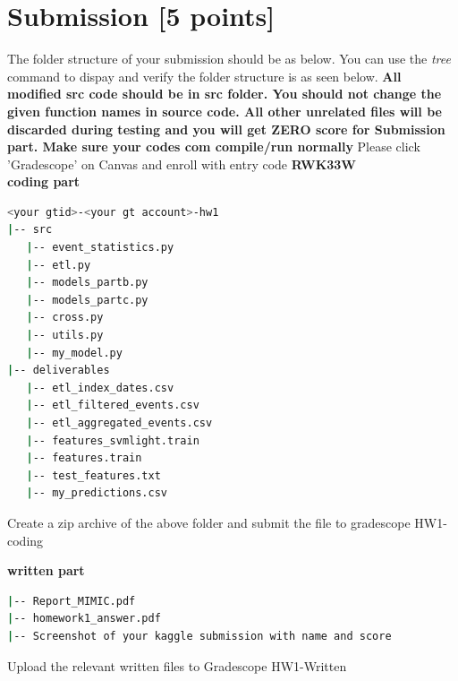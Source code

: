 \documentclass[12pt]{article}
\begin{document}

\section{Submission [5 points]}
The folder structure of your submission should be as below. You can use the \textit{tree} command to dispay and verify the folder structure is as seen below. \textbf{\color{red} All modified src code should be in src folder. You should not change the given function names in source code. All other unrelated files will be discarded during testing and you will get ZERO score for Submission part. Make sure your codes com compile/run normally}
Please click 'Gradescope' on Canvas and enroll with entry code \textbf{RWK33W}\\

\textbf{coding part}
\begin{lstlisting}[language=bash,frame=single]
<your gtid>-<your gt account>-hw1
|-- src
   |-- event_statistics.py
   |-- etl.py
   |-- models_partb.py
   |-- models_partc.py
   |-- cross.py
   |-- utils.py
   |-- my_model.py
|-- deliverables
   |-- etl_index_dates.csv
   |-- etl_filtered_events.csv
   |-- etl_aggregated_events.csv
   |-- features_svmlight.train
   |-- features.train
   |-- test_features.txt
   |-- my_predictions.csv
\end{lstlisting}
Create a zip archive of the above folder and submit the file to gradescope HW1-coding

\textbf{written part}
\begin{lstlisting}[language=bash,frame=single]
|-- Report_MIMIC.pdf
|-- homework1_answer.pdf
|-- Screenshot of your kaggle submission with name and score
\end{lstlisting}
Upload the relevant written files to Gradescope HW1-Written
\end{document}
